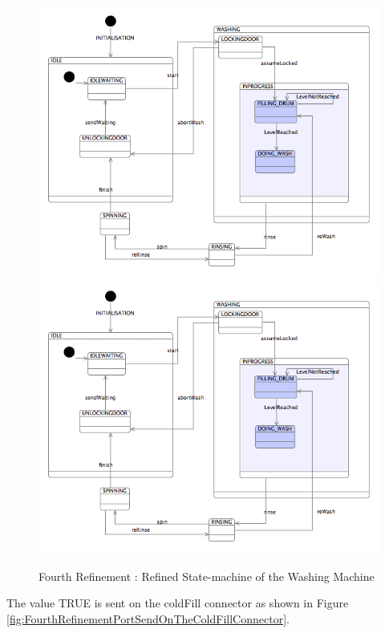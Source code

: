 \begin{figure}[!htbp]
  \centering
  \ifplastex
  \includegraphics[width=1024]{figures/image43.png}
  \else
  \includegraphics[width=1\textwidth]{figures/image43.png}
  \fi
  \caption{Fourth Refinement : Refined State-machine of the Washing Machine}
  \label{fig:FourthRefinementRefinedStatemachineOfTheWashingMachine}
\end{figure}  
 
The value TRUE is sent on the coldFill connector as shown in Figure \ref{fig:FourthRefinementPortSendOnTheColdFillConnector}.
 
